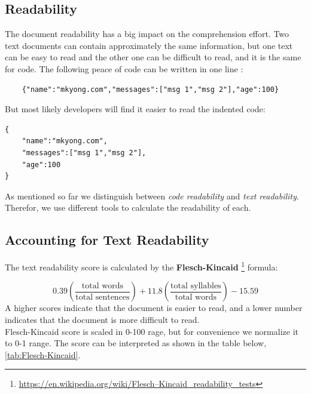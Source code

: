\documentclass[12pt,mscthesis]{usiinfthesis}
\begin{document}
	\subsection{Readability} 
		The document readability has a big impact on the comprehension effort. Two text documents can contain approximately the same information, but one text can be easy to read and the other one can be difficult to read, and it is the same for code. The following peace of code can be written in one line :

		\begin{lstlisting}
	{"name":"mkyong.com","messages":["msg 1","msg 2"],"age":100}

		\end{lstlisting}	
	But most likely developers will find it easier to read the indented code:\\

	 	\begin{lstlisting}
{
	"name":"mkyong.com",
	"messages":["msg 1","msg 2"],
	"age":100
}
	\end{lstlisting}
 
	As mentioned so far we distinguish between \emph{code readability} and \emph{text readability}. Therefor, we use different tools to calculate the readability of each. 

\subsection{Accounting for Text Readability}
	The text readability score is calculated by the \textbf{Flesch-Kincaid} \footnote{\url{https://en.wikipedia.org/wiki/Flesch–Kincaid_readability_tests}} formula:
	

	\[0.39\left({\frac  {{\mbox{total words}}}{{\mbox{total sentences}}}}\right)+11.8\left({\frac  {{\mbox{total syllables}}}{{\mbox{total words}}}}\right)-15.59\]
	A higher scores indicate that the document is easier to read, and a lower number indicates that the document is more difficult to read.\\ 
	Flesch-Kincaid score is scaled in 0-100 rage, but for convenience we normalize it to 0-1 range. The score can be interpreted as shown in the table below, \cref{tab:Flesch-Kincaid}.
	
\end{document}
